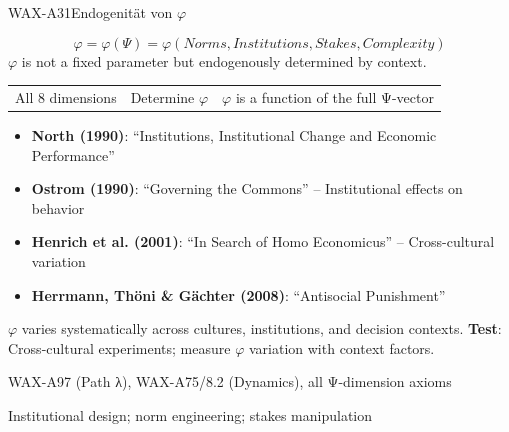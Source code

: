 \begin{axiomspec}{WAX-A31}{Endogenität von $\varphi$}

\begin{equation}
\varphi = \varphi(\Psi) = \varphi(Norms, Institutions, Stakes, Complexity)
\end{equation}
$\varphi$ is not a fixed parameter but endogenously determined by context.

\begin{tabular}{lll}
All 8 dimensions & Determine $\varphi$ & $\varphi$ is a function of the full Ψ-vector \\
\end{tabular}

\begin{itemize}
\item \textbf{North (1990)}: ``Institutions, Institutional Change and Economic Performance''
\item \textbf{Ostrom (1990)}: ``Governing the Commons'' -- Institutional effects on behavior
\item \textbf{Henrich et al. (2001)}: ``In Search of Homo Economicus'' -- Cross-cultural variation
\item \textbf{Herrmann, Thöni \& Gächter (2008)}: ``Antisocial Punishment''
\end{itemize}

$\varphi$ varies systematically across cultures, institutions, and decision contexts.
\textbf{Test}: Cross-cultural experiments; measure $\varphi$ variation with context factors.

WAX-A97 (Path λ), WAX-A75/8.2 (Dynamics), all Ψ-dimension axioms

Institutional design; norm engineering; stakes manipulation

\end{axiomspec}


